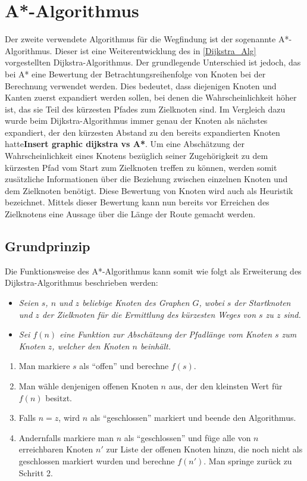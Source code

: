 \section{A*-Algorithmus}
	Der zweite verwendete Algorithmus für die Wegfindung ist der sogenannte A*-Algorithmus. Dieser ist eine Weiterentwicklung des in \ref{Dijkstra_Alg} vorgestellten Dijkstra-Algorithmus. Der grundlegende Unterschied ist jedoch, das bei A* eine Bewertung der Betrachtungsreihenfolge von Knoten bei der Berechnung verwendet werden. Dies bedeutet, dass diejenigen Knoten und Kanten zuerst expandiert werden sollen, bei denen die Wahrscheinlichkeit höher ist, das sie Teil des kürzesten Pfades zum Zielknoten sind. Im Vergleich dazu wurde beim Dijkstra-Algorithmus immer genau der Knoten als nächstes expandiert, der den kürzesten Abstand zu den bereits expandierten Knoten hatte\textbf{Insert graphic dijkstra vs A*}. Um eine Abschätzung der Wahrscheinlichkeit eines Knotens bezüglich seiner Zugehörigkeit zu dem  kürzesten Pfad vom Start zum Zielknoten treffen zu können, werden somit zusätzliche Informationen über die Beziehung zwischen einzelnen Knoten und dem Zielknoten benötigt. Diese Bewertung von Knoten wird auch als Heuristik bezeichnet. Mittels dieser Bewertung kann nun bereits vor Erreichen des Zielknotens eine Aussage über die Länge der Route gemacht werden.
	\subsection{Grundprinzip}
		\label{A*-Alg}
		Die Funktionsweise des A*-Algorithmus kann somit wie folgt als Erweiterung des Dijkstra-Algorithmus beschrieben werden\cite{Hart1968}:
		\begin{center}
			\begin{minipage}{0.8\linewidth}
				\begin{itemize}
					\item \textit{Seien $s$, $n$ und $z$ beliebige Knoten des Graphen $G$, wobei $s$ der Startknoten und $z$ der Zielknoten für die Ermittlung des kürzesten Weges von $s$ zu $z$ sind.}\\
					\item \textit{Sei $f(n)$ eine Funktion zur Abschätzung der Pfadlänge vom Knoten $s$ zum Knoten $z$, welcher den Knoten $n$ beinhält.}
				\end{itemize}
		
				\begin{enumerate}
					\item Man markiere $s$ als "`offen"' und berechne $f(s)$.
					\item Man wähle denjenigen offenen Knoten $n$ aus, der den  kleinsten Wert für $f(n)$ besitzt.
					\item Falls $n=z$, wird $n$ als "`geschlossen"' markiert und beende den Algorithmus.
					\item Andernfalls markiere man $n$ als "`geschlossen"' und füge alle von $n$ erreichbaren Knoten $n'$ zur Liste der offenen Knoten hinzu, die noch nicht als geschlossen markiert wurden und berechne $f(n')$. 	Man springe zurück zu Schritt 2.
				\end{enumerate}
			\end{minipage}
		\end{center}
		
